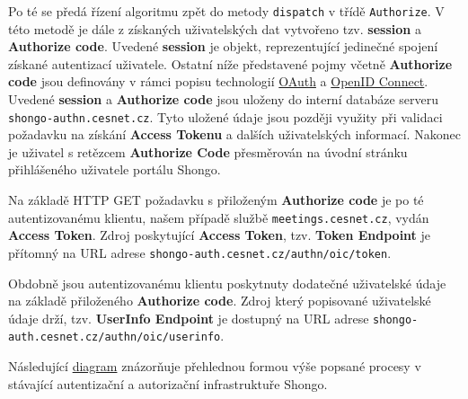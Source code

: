 \documentclass[
  printed, %
  twoside, %
  table,   %
  nolof,     %
  nolot,     %
]{fithesis3}
\begin{document}
Po té se předá řízení algoritmu zpět do metody \texttt{dispatch} v třídě \texttt{Authorize}. V této metodě je dále z získaných uživatelských dat vytvořeno tzv. \textbf{session} a \textbf{Authorize code}. Uvedené \textbf{session} je objekt, reprezentující jedinečné spojení získané autentizací uživatele. Ostatní níže představené pojmy včetně \textbf{Authorize code} jsou definovány v rámci popisu technologií \hyperref[sec:oauth]{OAuth} a \hyperref[sec:oidc]{OpenID Connect}. Uvedené \textbf{session} a \textbf{Authorize code} jsou uloženy do interní databáze serveru \texttt{shongo-authn.cesnet.cz}. Tyto uložené údaje jsou později využity při validaci požadavku na získání \textbf{Access Tokenu} a dalších uživatelských informací. Nakonec je uživatel s retězcem \textbf{Authorize Code} přesměrován na úvodní stránku přihlášeného uživatele portálu Shongo. \par

Na základě HTTP GET požadavku s přiloženým \textbf{Authorize code} je po té autentizovanému klientu, našem případě službě \texttt{meetings.cesnet.cz}, vydán  \textbf{Access Token}. Zdroj poskytující \textbf{Access Token}, tzv. \textbf{Token Endpoint} je přítomný na URL adrese \texttt{shongo-auth.cesnet.cz/authn/oic/token}. \par 

Obdobně jsou autentizovanému klientu poskytnuty dodatečné uživatelské údaje na základě přiloženého \textbf{Authorize code}. Zdroj který popisované uživatelské údaje drží, tzv. \textbf{UserInfo Endpoint} je dostupný na URL adrese \texttt{shongo-auth.cesnet.cz/authn/oic/userinfo}.  \par 

Následující \hyperref[fig:shongoAuthnProcess]{diagram} znázorňuje přehlednou formou výše popsané procesy v stávající autentizační a autorizační infrastruktuře Shongo. 
\end{document}
